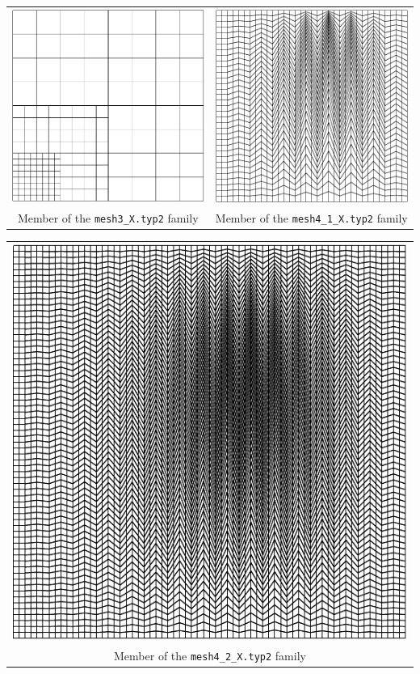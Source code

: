 \documentclass{article}
\begin{document}
\begin{center}
\begin{tabular}{cc}
\includegraphics[width=0.5\linewidth]{mesh3_2.pdf} & \includegraphics[width=0.5\linewidth]{mesh4_1_2.pdf}\\
{Member of the \texttt{mesh3\_X.typ2} family} & {Member of the \texttt{mesh4\_1\_X.typ2} family}
\end{tabular}
\end{center}


\begin{center}
\begin{tabular}{c}
\includegraphics[width=0.5\linewidth]{mesh4_2_2.pdf}\\
{Member of the \texttt{mesh4\_2\_X.typ2} family}
\end{tabular}
\end{center}
\end{document}
